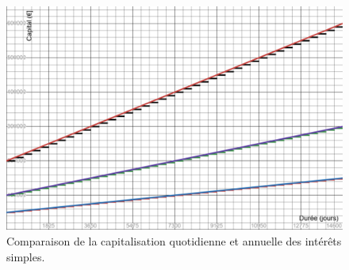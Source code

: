 \documentclass{article}
\begin{document}
\begin{enumerate}[label=\textbf{Q\arabic*.}]
    \begin{figure}[h!]
        \centering
        \includegraphics[width=\textwidth]{interets_simples.png}
        \caption{Comparaison de la capitalisation quotidienne et annuelle des intérêts simples.}
        \label{fig:interets_simples}
    \end{figure}


\end{enumerate}
\end{document}
